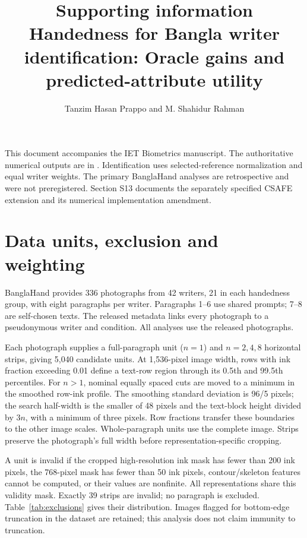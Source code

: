 \documentclass[10pt,a4paper]{article}
\title{Supporting information\\[4pt]\large Handedness for Bangla writer identification: Oracle gains and predicted-attribute utility}
\author{Tanzim Hasan Prappo and M. Shahidur Rahman}
\date{}
\begin{document}
\maketitle
\vspace{-12pt}
This document accompanies the IET Biometrics manuscript. The authoritative numerical outputs are in . Identification uses selected-reference normalization and equal writer weights. The primary BanglaHand analyses are retrospective and were not preregistered. Section S13 documents the separately specified CSAFE extension and its numerical implementation amendment.

\section{Data units, exclusion and weighting}
BanglaHand provides 336 photographs from 42 writers, 21 in each handedness group, with eight paragraphs per writer. Paragraphs 1--6 use shared prompts; 7--8 are self-chosen texts. The released metadata links every photograph to a pseudonymous writer and condition. All analyses use the released photographs.

Each photograph supplies a full-paragraph unit ($n=1$) and $n=2,4,8$ horizontal strips, giving 5,040 candidate units. At 1,536-pixel image width, rows with ink fraction exceeding 0.01 define a text-row region through its 0.5th and 99.5th percentiles. For $n>1$, nominal equally spaced cuts are moved to a minimum in the smoothed row-ink profile. The smoothing standard deviation is 96/5 pixels; the search half-width is the smaller of 48 pixels and the text-block height divided by $3n$, with a minimum of three pixels. Row fractions transfer these boundaries to the other image scales. Whole-paragraph units use the complete image. Strips preserve the photograph's full width before representation-specific cropping.

A unit is invalid if the cropped high-resolution ink mask has fewer than 200 ink pixels, the 768-pixel mask has fewer than 50 ink pixels, contour/skeleton features cannot be computed, or their values are nonfinite. All representations share this validity mask. Exactly 39 strips are invalid; no paragraph is excluded. Table~\ref{tab:exclusions} gives their distribution. Images flagged for bottom-edge truncation in the dataset are retained; this analysis does not claim immunity to truncation.
\end{document}
